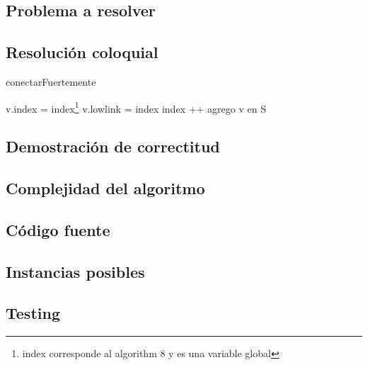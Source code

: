 \subsection{Problema a resolver}


\subsection{Resolución coloquial}

\begin{algorithm}[H]
	\SetAlgoLined
	\caption{conectarFuertemente}

	v.index = index\footnote{index corresponde al algorithm 8 y es una variable global}\;
	v.lowlink = index\;
	index ++\;
	agrego v en S\;


\end{algorithm}

\subsection{Demostración de correctitud}

\subsection{Complejidad del algoritmo}

\subsection{Código fuente}



\subsection{Instancias posibles}



\subsection{Testing}